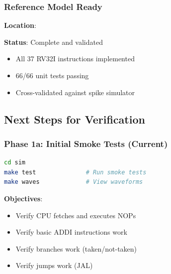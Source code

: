 \subsubsection{Reference Model Ready}\label{cr:fix:cpu-verification-ready:reference-model-ready}

\begin{record}

\textbf{Location}: 

\textbf{Status}: \ok{} Complete and validated

\begin{itemize}
\tightlist
\item
  All 37 RV32I instructions implemented
\item
  66/66 unit tests passing
\item
  Cross-validated against spike simulator
\end{itemize}

\end{record}

\subsection{Next Steps for Verification}\label{cr:fix:cpu-verification-ready:next-steps-for-verification}

\subsubsection{Phase 1a: Initial Smoke Tests (Current)}\label{cr:fix:cpu-verification-ready:phase-1a-initial-smoke-tests-current}

\begin{record}

\begin{lstlisting}[language=bash]
cd sim
make test              # Run smoke tests
make waves             # View waveforms
\end{lstlisting}

\textbf{Objectives}:

\begin{itemize}
\tightlist
\item
  Verify CPU fetches and executes NOPs
\item
  Verify basic ADDI instructions work
\item
  Verify branches work (taken/\allowbreak{}not-taken)
\item
  Verify jumps work (JAL)
\end{itemize}

\end{record}


